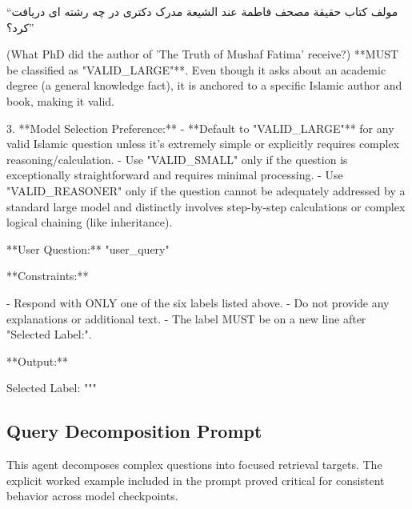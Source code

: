 \documentclass[11pt]{article}
\newcommand{\fa}[1]{\textfarsi{#1}}
\begin{document}
\fa{``مولف کتاب حقيقة مصحف فاطمة عند الشيعة مدرک دکتری در چه رشته ای دریافت کرد؟''}

\begin{PromptBlock}
(What PhD did the author of 'The Truth of Mushaf Fatima' receive?) **MUST be classified as "VALID_LARGE"**. Even though it asks about an academic degree (a general knowledge fact), it is anchored to a specific Islamic author and book, making it valid.

3. **Model Selection Preference:**
   - **Default to "VALID_LARGE"** for any valid Islamic question unless it's extremely simple or explicitly requires complex reasoning/calculation.
   - Use "VALID_SMALL" only if the question is exceptionally straightforward and requires minimal processing.
   - Use "VALID_REASONER" only if the question cannot be adequately addressed by a standard large model and distinctly involves step-by-step calculations or complex logical chaining (like inheritance).

**User Question:** "{user_query}"

**Constraints:**

- Respond with ONLY one of the six labels listed above.
- Do not provide any explanations or additional text.
- The label MUST be on a new line after "Selected Label:".

**Output:**

Selected Label: """
\end{PromptBlock}

\subsection{Query Decomposition Prompt}

This agent decomposes complex questions into focused retrieval targets. The explicit worked example included in the prompt proved critical for consistent behavior across model checkpoints.
\end{document}

